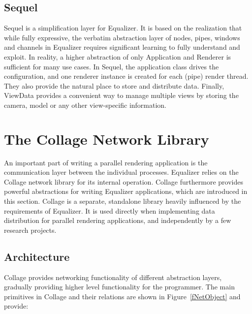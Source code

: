 \documentclass[10pt,journal,compsoc]{IEEEtran}
\newcommand{\fig}[1]{Figure~\ref{#1}}
\providecommand{\DIFaddtex}[1]{{\protect\color{blue} \sf #1}} %
\providecommand{\DIFaddbegin}{} %
\providecommand{\DIFaddend}{} %
\providecommand{\DIFadd}[1]{\texorpdfstring{\DIFaddtex{#1}}{#1}} %
\newcommand{\DIFaddincludegraphics}[2][]{{\color{blue}\fbox{\DIFOincludegraphics[#1]{#2}}}} %
\DeclareRobustCommand{\DIFaddbegin}{\DIFOaddbegin \let\includegraphics\DIFaddincludegraphics} %
\DeclareRobustCommand{\DIFaddend}{\DIFOaddend \let\includegraphics\DIFOincludegraphics} %
\begin{document}
\subsection{\textsf{Sequel}}\label{sec:sequel}

\textsf{Sequel} is a simplification layer for \textsf{Equalizer}. It is based on
the realization that while fully expressive, the verbatim abstraction layer of
nodes, pipes, windows and channels in \textsf{Equalizer} requires significant
learning to fully understand and exploit. In reality, a higher abstraction of
only \textsf{Application} and \textsf{Renderer} is sufficient for many use
cases. In \textsf{Sequel}, the application class drives the configuration, and
one renderer instance is created for each (pipe) render thread. They also
provide the natural place to store and distribute data. Finally,
\textsf{ViewData} provides a convenient way to manage multiple views by storing
the camera, model or any other view-specific information.


\section{The \textsf{Collage} Network Library}

An important part of writing a parallel rendering application is the
communication layer between the individual processes. \textsf{Equalizer} relies
on the \textsf{Collage} network library for its internal operation.
\textsf{Collage} furthermore provides powerful abstractions for writing
\textsf{Equalizer} applications, which are introduced in this section.
\DIFaddbegin \DIFadd{\textsf{Collage} is a separate, standalone library heavily influenced by the
requirements of \textsf{Equalizer}. It is used directly when implementing data
distribution for parallel rendering applications, and independently by a few
research projects.
}\DIFaddend 

\subsection{Architecture}

\textsf{Collage} provides networking functionality of different abstraction
layers, gradually providing higher level functionality for the programmer. The
main primitives in \textsf{Collage} and their relations are shown in
\fig{fNetObject} and provide:
\end{document}
